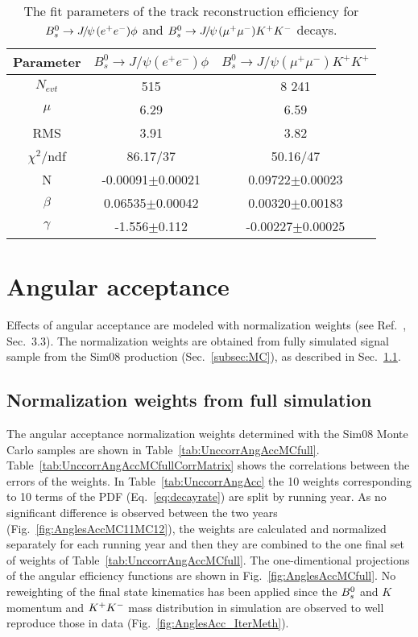 \begin{table}[htb]
  \caption{
    The fit parameters of the track reconstruction efficiency for ${{B}^0_{s}}\rightarrow{\ensuremath{{J\mskip -3mu/\mskip -2mu\psi\mskip 2mu}}}({e^+e^-})\phi$ and ${{B}^0_{s}}\rightarrow{\ensuremath{{J\mskip -3mu/\mskip -2mu\psi\mskip 2mu}}}({\mu^+\mu^-}){{K}^+}{{K}^-}$ decays.}
    \small{
\begin{center}\begin{tabular}{c|c|c}
   \hline
   Parameter & $B^{0}_{s}\rightarrow J/\psi(e^{+}e^{-})\phi$ & $B^{0}_{s}\rightarrow J/\psi(\mu^{+}\mu^{-})K^{+}K^{+}$ \\
  \hline
   $N_{evt}$ & 515 & 8 241\\
   $\mu$ & 6.29 & 6.59\\
   RMS & 3.91 & 3.82\\
   $\chi^{2}$/ndf & 86.17/37 & 50.16/47\\
   N & -0.00091$\pm$0.00021 & 0.09722$\pm$0.00023\\
   $\beta$ & 0.06535$\pm$0.00042 & 0.00320$\pm$0.00183\\
   $\gamma$&-1.556$\pm$0.112 & -0.00227$\pm$0.00025\\
   \hline
    \end{tabular}
   \end{center}
  }
\label{tab:TRackRecEff}
\end{table}
\clearpage

\section{Angular acceptance}\label{sec:AngAcc}

Effects of angular acceptance are modeled with normalization weights (see Ref.~\cite{Aaij:2012-067}, Sec.~3.3). The normalization weights are obtained from fully simulated signal sample from the Sim08 production (Sec.~\ref{subsec:MC}), as described in Sec.~\ref{subsec:NormWeightMC}. 

\subsection{Normalization weights from full simulation}\label{subsec:NormWeightMC}
 The angular acceptance normalization weights determined with the Sim08 Monte Carlo samples are shown in Table~\ref{tab:UnccorrAngAccMCfull}. Table~\ref{tab:UnccorrAngAccMCfullCorrMatrix} shows the correlations between the errors of the weights. In Table~\ref{tab:UnccorrAngAcc} the 10 weights corresponding to 10 terms of the PDF (Eq.~\ref{eq:decayrate}) are split by running year. As no significant difference is observed between the two years (Fig.~\ref{fig:AnglesAccMC11MC12}), the weights are calculated and normalized separately for each running year and then they are combined to the one final set of weights of Table~\ref{tab:UnccorrAngAccMCfull}. The one-dimentional projections of the angular efficiency functions are shown in Fig.~\ref{fig:AnglesAccMCfull}. No reweighting of the final state kinematics has been applied since the ${{B}^0_{s}}$ and $K$ momentum and ${{K}^+}{{K}^-}$ mass distribution in simulation are observed to well reproduce those in data (Fig.~\ref{fig:AnglesAcc_IterMeth}).



